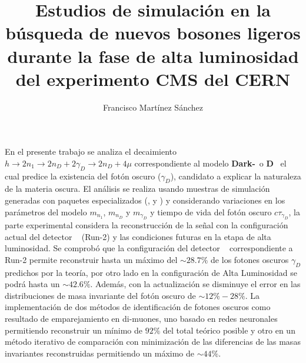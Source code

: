 \documentclass[12pt]{report}
\begin{document}
\title{Estudios de simulación en la búsqueda de nuevos bosones ligeros durante la fase de alta luminosidad del experimento CMS del CERN}
\author{Francisco Martínez Sánchez}
\maketitle
%

\begin{resumen}\thispagestyle{empty}
En el presente trabajo se analiza el decaimiento $h \rightarrow 2n_1 \rightarrow 2n_D + 2\gamma_D \rightarrow 2n_D + 4\mu$ correspondiente al modelo \textbf{Dark-}\SUSY ~o \MSSM\textbf{D}~ el cual predice la existencia del fotón oscuro ($\gamma_{D}$), candidato a explicar la naturaleza de la materia oscura. El análisis se realiza usando muestras de simulación generadas con paquetes especializados (,  y ) y considerando variaciones en los par\'ametros del modelo $m_{n_1}$, $m_{n_D}$ y $m_{\gamma_D}$ y tiempo de vida del fotón oscuro $c\tau_{\gamma_D}$, la parte experimental considera la reconstrucción de la señal con la configuración actual del detector \CMS~ (Run-2) y las condiciones futuras en la etapa de alta luminosidad.
Se comprobó que la configuración del detector \CMS~ correspondiente a Run-2 permite reconstruir hasta un máximo del $\sim 28.7\%$ de los fotones oscuros $\gamma_D$ predichos por la teoría, por otro lado en la configuración de Alta Luminosidad se podrá hasta un $\sim 42.6\%$. Además, con la actualización se disminuye el error en las distribuciones de masa invariante del fotón oscuro de $\sim 12\% - 28\%$. La implementación de dos métodos de identificación de fotones oscuros como resultado de emparejamiento en di-muones, uno basado en redes neuronales permitiendo reconstruir un mínimo de $92\%$ del total teórico posible y otro en un método iterativo de comparación con minimización de las diferencias de las masas invariantes reconstruidas permitiendo un máximo de $\sim 44\%$.





\end{resumen}
\end{document}
